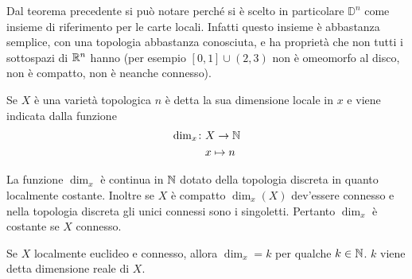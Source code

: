 \begin{remark}
	Dal teorema precedente si può notare perché si è scelto in particolare $\mathbb{D}^n$ come insieme di riferimento per le carte locali. Infatti questo insieme è abbastanza semplice, con una topologia abbastanza conosciuta, e ha proprietà che non tutti i sottospazi di $\mathbb{R}^n$ hanno (per esempio $\left[0,1\right] \cup (2,3)$ non è omeomorfo al disco, non è compatto, non è neanche connesso).
\end{remark}

\begin{definition}
	Se $X$ è una varietà topologica $n$ è detta la sua dimensione locale in $x$ e viene indicata dalla funzione
	\begin{equation}
	\begin{aligned}	
	\dim_x	\colon & X \rightarrow \mathbb{N} \\
	& 	x	\mapsto n \\
	\end{aligned}
	\end{equation}
\end{definition}

\begin{definition}
	La funzione $\dim_x$ è continua in $\mathbb{N}$ dotato della topologia discreta in quanto localmente costante. Inoltre se $X$ è compatto $\dim_x(X)$ dev'essere connesso e nella topologia discreta gli unici connessi sono i singoletti. Pertanto $\dim_x$ è costante se $X$ connesso.
\end{definition}

\begin{corollary}
	Se $X$ localmente euclideo e connesso, allora $\dim_x = k$ per qualche $k \in \mathbb{N}$. $k$ viene detta dimensione reale di $X$.
\end{corollary}

